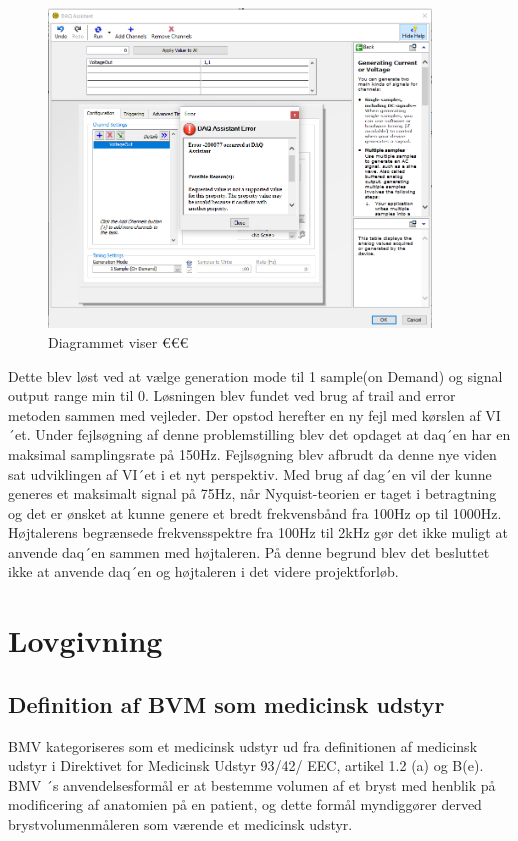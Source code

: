 \begin{figure}[htb]
			\centering
				\includegraphics[width=4in]{FejlDAQAssistant}
				\caption{Diagrammet viser €€€}	
				\label{fig:FejlDAQAssistant}
			\end{figure}
			
			
Dette blev løst ved at vælge generation mode til 1 sample(on Demand) og signal output range min til 0. Løsningen blev fundet ved brug af trail and error metoden sammen med vejleder. Der opstod herefter en ny fejl med kørslen af VI´et. Under fejlsøgning af denne problemstilling blev det opdaget at daq´en har en maksimal samplingsrate på 150Hz. Fejlsøgning blev afbrudt da denne nye viden sat udviklingen af VI´et i et nyt perspektiv. Med brug af dag´en vil der kunne generes  et maksimalt signal på 75Hz, når Nyquist-teorien er taget i betragtning og det er ønsket at kunne genere et bredt frekvensbånd fra 100Hz op til 1000Hz. Højtalerens begrænsede frekvensspektre fra 100Hz til 2kHz  gør det ikke muligt at anvende daq´en sammen med højtaleren. 
På denne begrund blev det besluttet ikke at anvende daq´en og højtaleren i det videre projektforløb. 	
	
\section{Lovgivning}

\subsection{Definition af BVM som medicinsk udstyr}

BMV kategoriseres som et medicinsk udstyr ud fra definitionen af medicinsk udstyr i Direktivet for Medicinsk Udstyr 93/42/ EEC, artikel 1.2 (a) og B(e). BMV ´s anvendelsesformål er at bestemme volumen af et bryst med henblik på modificering af anatomien på en patient, og dette formål myndiggører derved brystvolumenmåleren som værende et medicinsk udstyr. 


